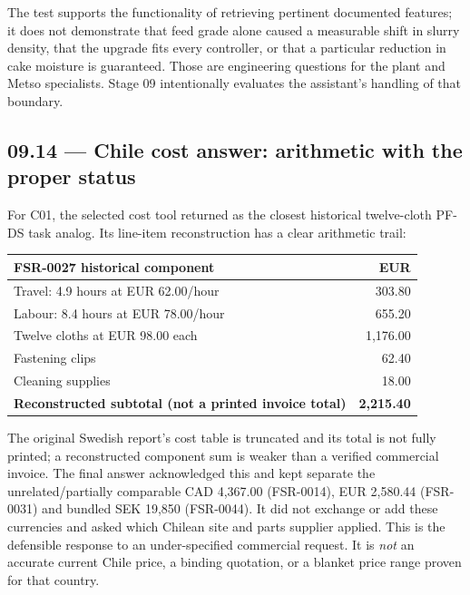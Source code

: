 \documentclass[11pt,a4paper]{article}
\DeclareRobustCommand{\code}[1]{{\ttfamily\small\detokenize{#1}}}
\begin{document}
The test supports the functionality of retrieving pertinent documented features; it does not demonstrate that feed grade alone caused a measurable shift in slurry density, that the upgrade fits every controller, or that a particular reduction in cake moisture is guaranteed. Those are engineering questions for the plant and Metso specialists. Stage 09 intentionally evaluates the assistant's handling of that boundary.

\subsection{09.14 --- Chile cost answer: arithmetic with the proper status}
For C01, the selected cost tool returned \code{FSR-0027} as the closest historical twelve-cloth PF-DS task analog. Its line-item reconstruction has a clear arithmetic trail:
\begin{tabularx}{\textwidth}{@{}Y r@{}}
\toprule\textbf{FSR-0027 historical component} & \textbf{EUR}\\\midrule
Travel: 4.9 hours at EUR 62.00/hour & 303.80\\
Labour: 8.4 hours at EUR 78.00/hour & 655.20\\
Twelve cloths at EUR 98.00 each & 1,176.00\\
Fastening clips & 62.40\\
Cleaning supplies & 18.00\\\midrule
\textbf{Reconstructed subtotal (not a printed invoice total)} & \textbf{2,215.40}\\\bottomrule
\end{tabularx}
The original Swedish report's cost table is truncated and its total is not fully printed; a reconstructed component sum is weaker than a verified commercial invoice. The final answer acknowledged this and kept separate the unrelated/partially comparable CAD 4,367.00 (FSR-0014), EUR 2,580.44 (FSR-0031) and bundled SEK 19,850 (FSR-0044). It did not exchange or add these currencies and asked which Chilean site and parts supplier applied. This is the defensible response to an under-specified commercial request. It is \emph{not} an accurate current Chile price, a binding quotation, or a blanket price range proven for that country.
\end{document}
